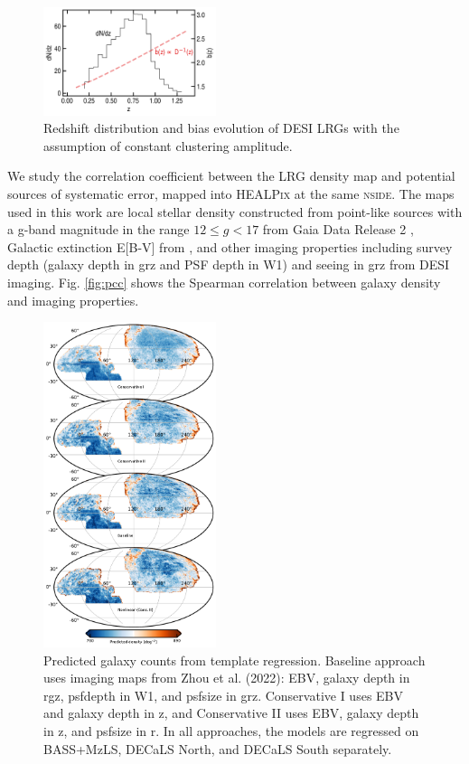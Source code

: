 \begin{figure}
    \centering
    \includegraphics[width=0.45\textwidth]{figures/nz_lrg.pdf}
    \caption{Redshift distribution and bias evolution of DESI LRGs with the assumption of constant clustering amplitude.}
    \label{fig:nz}
\end{figure}


We study the correlation coefficient between the LRG density map and potential sources of systematic error, mapped into \textsc{HEALPix} at the same \textsc{nside}. The maps used in this work are local stellar density constructed from point-like sources with a g-band magnitude in the range $12 \leq g < 17$ from Gaia Data Release 2 \citep[see,][]{gaiadr2, myers2022},  Galactic extinction E[B-V] from \cite{schlegel1998maps}, and other imaging properties including survey depth (galaxy depth in grz and PSF depth in W1) and seeing in grz from DESI imaging. Fig. \ref{fig:pcc} shows the Spearman correlation between galaxy density and imaging properties.

\begin{figure}
    \centering
    \includegraphics[width=0.45\textwidth]{figures/npred.pdf}
    \caption{Predicted galaxy counts from template regression. Baseline approach uses imaging maps from Zhou et al. (2022): EBV, galaxy depth in rgz, psfdepth in W1, and psfsize in grz. Conservative I uses EBV and galaxy depth in z, and Conservative II uses EBV, galaxy depth in z, and psfsize in r. In all approaches, the models are regressed on BASS+MzLS, DECaLS North, and DECaLS South separately.}
    \label{fig:npred}
\end{figure}

